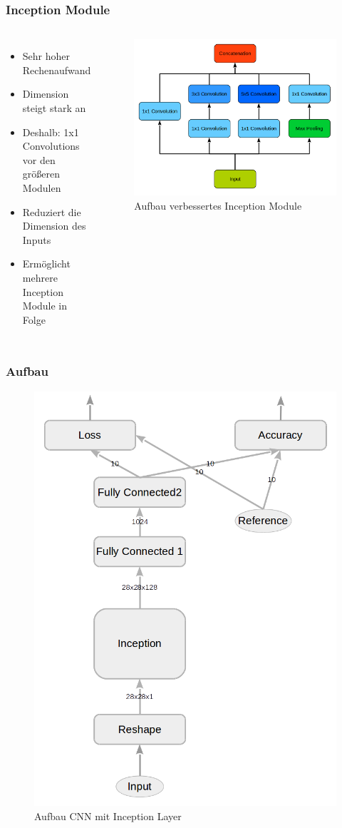 \documentclass{beamer}
\begin{document}
\begin{frame}
	\frametitle{Inception Module}
	\begin{columns}[c]
		\begin{itemize}
			\item Sehr hoher Rechenaufwand
			\item Dimension steigt stark an
			\item Deshalb: 1x1 Convolutions vor den größeren Modulen
			\item Reduziert die Dimension des Inputs
			\item Ermöglicht mehrere Inception Module in Folge 
		\end{itemize}
		
		\begin{figure}
			\includegraphics[width=\linewidth]{images/inception_pro_graph.png}
			\caption{Aufbau verbessertes Inception Module}
			\label{fig:pro_inception}
		\end{figure}
	\end{columns}
\end{frame}

\begin{frame}
	\frametitle{Aufbau}
	\begin{figure}
		\includegraphics[width=0.4\linewidth]{images/main_graph_inception_reduced.png}
		\caption{Aufbau CNN mit Inception Layer}
		\label{fig:main_graph_inception}
	\end{figure}
\end{frame}
\end{document}
